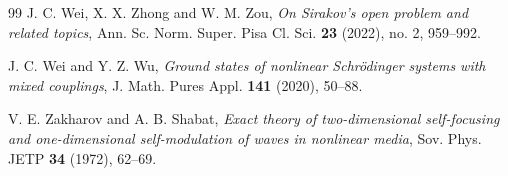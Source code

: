 \documentclass[11pt]{article}
\numberwithin{equation}{section}
\theoremstyle{definition}
\begin{document}
\begin{thebibliography}{99}
J. C. Wei, X. X. Zhong and W. M. Zou,
\emph{On Sirakov's open problem and related topics},
Ann. Sc. Norm. Super. Pisa Cl. Sci. \textbf{23} (2022), no. 2, 959--992.

J. C. Wei and Y. Z. Wu,
\emph{Ground states of nonlinear Schr\"{o}dinger systems with mixed couplings},
J. Math. Pures Appl. \textbf{141} (2020), 50--88.

V. E. Zakharov and A. B. Shabat,
\emph{Exact theory of two-dimensional self-focusing and one-dimensional self-modulation of waves in nonlinear media},
Sov. Phys. JETP \textbf{34} (1972), 62--69.
	




\end{thebibliography}
\end{document}
